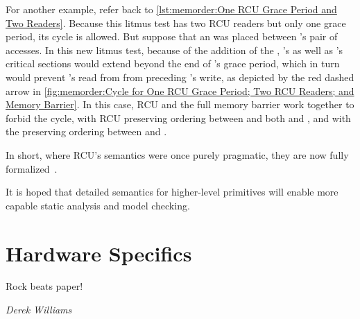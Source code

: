 For another example, refer back to
\cref{lst:memorder:One RCU Grace Period and Two Readers}.
Because this litmus test has two RCU readers but only one grace period,
its cycle is allowed.
But suppose that an  was placed between 's
pair of accesses.
In this new litmus test, because of the addition of the ,
's as well as 's critical sections would extend beyond the
end of 's grace period, which in turn would prevent 's
read from  from preceding 's write, as depicted by the
red dashed arrow in
\cref{fig:memorder:Cycle for One RCU Grace Period; Two RCU Readers; and Memory Barrier}.
In this case, RCU and the full memory barrier work together to forbid
the cycle, with RCU preserving ordering between  and both
 and , and with the  preserving
ordering between  and .

\QuickQuizEnd

In short, where RCU's semantics were once purely pragmatic, they are
now fully
formalized~\cite{PaulMcKenney2005RCUSemantics,MathieuDesnoyers2012URCU,AlexeyGotsman2013ESOPRCU,Alglave:2018:FSC:3173162.3177156}.




It is hoped that detailed semantics for higher-level primitives will
enable more capable static analysis and model checking.

\section{Hardware Specifics}
\label{sec:memorder:Hardware Specifics}
%
\epigraph{Rock beats paper!}{\emph{Derek Williams}}

